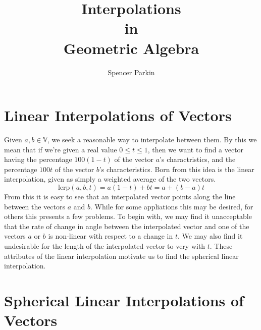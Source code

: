 \documentclass{article}
\title{Interpolations\\in\\Geometric Algebra}
\author{Spencer Parkin}
\begin{document}
\maketitle

\newcommand{\V}{\mathbb{V}}

\section*{Linear Interpolations of Vectors}

Given $a,b\in\V$, we seek a reasonable way to
interpolate between them.  By this we mean
that if we're given a real value $0\leq t\leq 1$,
then we want to find a vector having the percentage
$100(1-t)$ of the vector $a$'s charactristics, and
the percentage $100t$ of the vector $b$'s characteristics.
Born from this idea is the linear interpolation, given
as simply a weighted average of the two vectors.
\begin{equation*}
\mbox{lerp}(a,b,t) = a(1-t)+bt = a+(b-a)t
\end{equation*}
From this it is easy to see that an interpolated vector
points along the line between the vectors $a$ and $b$.
While for some appliations this may be desired, for others
this presents a few problems.  To begin with, we may find
it unacceptable that the rate of change in angle between
the interpolated vector and one of the vectors $a$ or $b$
is non-linear with respect to a change in $t$.  We may also
find it undesirable for the length of the interpolated
vector to very with $t$.
These attributes of the linear interpolation motivate us to
find the spherical linear interpolation.

\section*{Spherical Linear Interpolations of Vectors}
\end{document}

